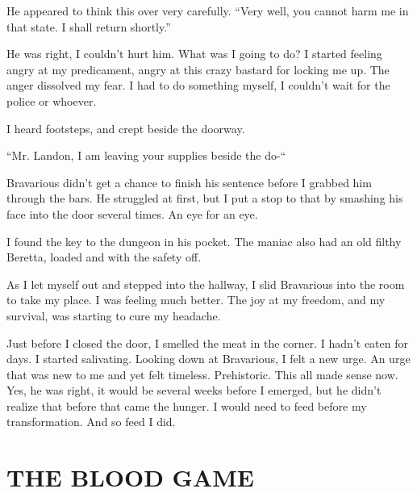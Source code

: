 He appeared to think this over very carefully. ``Very well,
you cannot harm me in that state. I shall return
shortly.''



He was right, I couldn't hurt him. What was I going to do? I
started feeling angry at my predicament, angry at this crazy
bastard for locking me up. The anger dissolved my fear. I had to do
something myself, I couldn't wait for the police or
whoever.



I heard footsteps, and crept beside the doorway.



``Mr. Landon, I am leaving your supplies beside the
do-``



Bravarious didn't get a chance to finish his sentence before
I grabbed him through the bars. He struggled at first, but I put a
stop to that by smashing his face into the door several times. An
eye for an eye.



I found the key to the dungeon in his pocket. The maniac also had
an old filthy Beretta, loaded and with the safety off.



As I let myself out and stepped into the hallway, I slid Bravarious
into the room to take my place. I was feeling much better. The joy
at my freedom, and my survival, was starting to cure my
headache.



Just before I closed the door, I smelled the meat in the corner. I
hadn't eaten for days. I started salivating. Looking down at
Bravarious, I felt a new urge. An urge that was new to me and yet
felt timeless. Prehistoric. This all made sense now. Yes, he was
right, it would be several weeks before I emerged, but he
didn't realize that before that came the hunger. I would need
to feed before my transformation. And so feed I did. 

 



%
%
%
%
%
%
%
% 
%
%
%

\chapter{THE BLOOD GAME}

